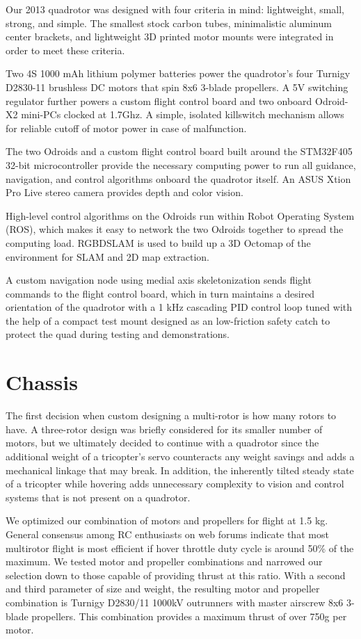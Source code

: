 \documentclass[12pt,letterpaper]{article} \usepackage[margin=1in]{geometry}
\begin{document}
Our 2013 quadrotor was designed with four criteria in mind: lightweight, small,
strong, and simple. The smallest stock carbon tubes, minimalistic aluminum
center brackets, and lightweight 3D printed motor mounts were integrated in
order to meet these criteria.

Two 4S 1000 mAh lithium polymer batteries power the quadrotor’s four Turnigy
D2830-11 brushless DC motors that spin 8x6 3-blade propellers. A 5V switching
regulator further powers a custom flight control board and two onboard
Odroid-X2 mini-PCs clocked at 1.7Ghz. A simple, isolated killswitch mechanism
allows for reliable cutoff of motor power in case of malfunction.

The two Odroids and a custom flight control board built around the STM32F405
32-bit microcontroller provide the necessary computing power to run all
guidance, navigation, and control algorithms onboard the quadrotor itself. An
ASUS Xtion Pro Live stereo camera provides depth and color vision. 

High-level control algorithms on the Odroids run within Robot Operating System
(ROS), which makes it easy to network the two Odroids together to spread the
computing load. RGBDSLAM is used to build up a 3D Octomap of the environment
for SLAM and 2D map extraction.

A custom navigation node using medial axis skeletonization sends flight
commands to the flight control board, which in turn maintains a desired
orientation of the quadrotor with a 1 kHz cascading PID control loop tuned with
the help of a compact test mount designed as an low-friction safety catch to
protect the quad during testing and demonstrations.



\section*{Chassis}

The first decision when custom designing a multi-rotor is how many rotors to
have. A three-rotor design was briefly considered for its smaller number of
motors, but we ultimately decided to continue with a quadrotor since the
additional weight of a tricopter’s servo counteracts any weight savings and
adds a mechanical linkage that may break. In addition, the inherently tilted
steady state of a tricopter while hovering adds unnecessary complexity to
vision and control systems that is not present on a quadrotor.

We optimized our combination of motors and propellers for flight at 1.5 kg.
General consensus among RC enthusiasts on web forums indicate that most
multirotor flight is most efficient if hover throttle duty cycle is around 50\%
of the maximum. We tested motor and propeller combinations and narrowed our
selection down to those capable of providing thrust at this ratio. With
a second and third parameter of size and weight, the resulting motor and
propeller combination is Turnigy D2830/11 1000kV outrunners with master
airscrew 8x6 3-blade propellers. This combination provides a maximum thrust of
over 750g per motor.
\end{document}
